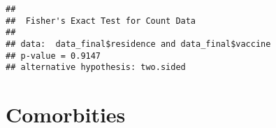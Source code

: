 \documentclass[
]{article}
\newenvironment{Shaded}{\begin{snugshade}}{\end{snugshade}}
\newcommand{\FunctionTok}[1]{\textcolor[rgb]{0.00,0.00,0.00}{#1}}
\newcommand{\NormalTok}[1]{#1}
\newcommand{\SpecialCharTok}[1]{\textcolor[rgb]{0.00,0.00,0.00}{#1}}
\begin{document}
\begin{Shaded}
\end{Shaded}

\begin{verbatim}
## 
##  Fisher's Exact Test for Count Data
## 
## data:  data_final$residence and data_final$vaccine
## p-value = 0.9147
## alternative hypothesis: two.sided
\end{verbatim}

\hypertarget{comorbities}{%
\section{Comorbities}\label{comorbities}}
\end{document}

